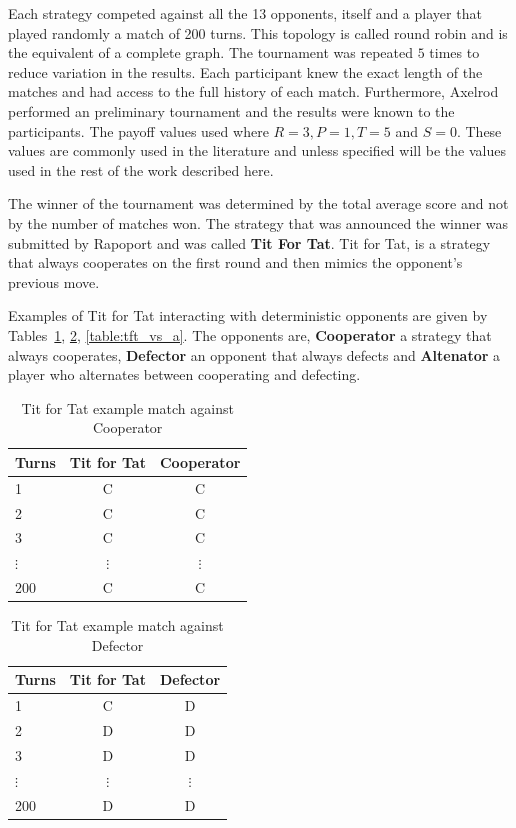 \documentclass{article}
\begin{document}
Each strategy competed against all the 13 opponents, itself and a player that played
randomly a match of 200 turns. This topology is called round robin and is the 
equivalent of a complete graph. The tournament was repeated \(5\) times to
reduce variation in the results. Each participant knew the exact length of the
matches and had access to the full history of each match. Furthermore, Axelrod
performed an preliminary tournament and the results were known to the participants.
The payoff values used where \(R=3, P=1, T=5\) and \(S=0\). These values are
commonly used in the literature and unless specified will be the values used in
the rest of the work described here. 

The winner of the tournament was determined by the total average score and not by
the number of matches won. The strategy that was announced the winner was
submitted by Rapoport and was called \textbf{Tit For Tat}. Tit for Tat, is a 
strategy that always cooperates on the first round and then mimics the opponent's
previous move. 

Examples of Tit for Tat interacting with deterministic opponents are given by 
Tables~\ref{table:tft_vs_c}, \ref{table:tft_vs_d}, \ref{table:tft_vs_a}. 
The opponents are, \textbf{Cooperator} a strategy that always cooperates, 
\textbf{Defector} an opponent that always defects and \textbf{Altenator} a 
player who alternates between cooperating and defecting.

\begin{table}[!hbtp]
    \begin{center}
    \begin{tabular}{lcc}
        \toprule
        Turns & Tit for Tat & Cooperator\\
        \toprule
        1 & C & C\\
        2 & C & C\\
        3 & C & C\\
        $\vdots$ & $\vdots$ & $\vdots$ \\
        200 & C & C \\
        \bottomrule
    \end{tabular}
    \caption{Tit for Tat example match against Cooperator}\label{table:tft_vs_c}
    \end{center}
\end{table}

\begin{table}[!hbtp]
    \begin{center}
    \begin{tabular}{lcc}
        \toprule
        Turns & Tit for Tat & Defector\\
        \toprule
        1 & C & D\\
        2 & D & D\\
        3 & D & D\\ 
        $\vdots$ & $\vdots$ & $\vdots$ \\ 
        200 & D & D \\
        \bottomrule
    \end{tabular}
    \caption{Tit for Tat example match against Defector}\label{table:tft_vs_d}
\end{center}
\end{table}
\end{document}

